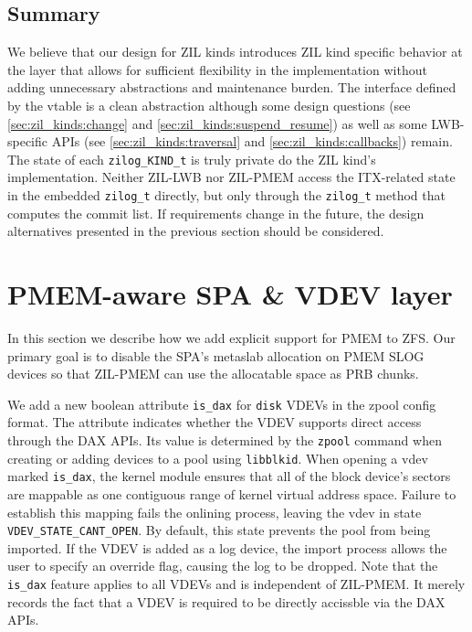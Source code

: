 \documentclass[12pt,a4paper,twoside]{book}
\begin{document}
\subsection{Summary}
We believe that our design for ZIL kinds introduces ZIL kind specific behavior at the layer that allows for sufficient flexibility in the implementation without adding unnecessary abstractions and maintenance burden.
The interface defined by the vtable is a clean abstraction although some design questions (see \ref{sec:zil_kinds:change} and \ref{sec:zil_kinds:suspend_resume}) as well as some LWB-specific APIs (see \ref{sec:zil_kinds:traversal} and \ref{sec:zil_kinds:callbacks}) remain.
The state of each \lstinline{zilog_KIND_t} is truly private do the ZIL kind's implementation.
Neither ZIL-LWB nor ZIL-PMEM access the ITX-related state in the embedded \lstinline{zilog_t} directly, but only through the \lstinline{zilog_t} method that computes the commit list.
If requirements change in the future, the design alternatives presented in the previous section should be considered.

\section{PMEM-aware SPA \& VDEV layer}
In this section we describe how we add explicit support for PMEM to ZFS.
Our primary goal is to disable the SPA's metaslab allocation on PMEM SLOG devices so that ZIL-PMEM can use the allocatable space as PRB chunks.

We add a new boolean attribute \lstinline{is_dax} for \lstinline{disk} VDEVs in the zpool config format.
The attribute indicates whether the VDEV supports direct access through the DAX APIs.
Its value is determined by the \lstinline{zpool} command when creating or adding devices to a pool using \lstinline{libblkid}.
When opening a vdev marked \lstinline{is_dax}, the kernel module ensures that all of the block device's sectors are mappable as one contiguous range of kernel virtual address space.
Failure to establish this mapping fails the onlining process, leaving the vdev in state \lstinline{VDEV_STATE_CANT_OPEN}.
By default, this state prevents the pool from being imported.
If the VDEV is added as a log device, the import process allows the user to specify an override flag, causing the log to be dropped.
Note that the \lstinline{is_dax} feature applies to all VDEVs and is independent of ZIL-PMEM.
It merely records the fact that a VDEV is required to be directly accissble via the DAX APIs.
\end{document}
